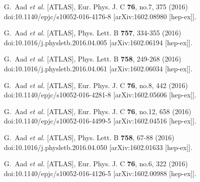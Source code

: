 \begin{thebibliography}{9}
G.~Aad \textit{et al.} [ATLAS],
Eur. Phys. J. C \textbf{76}, no.7, 375 (2016)
doi:10.1140/epjc/s10052-016-4176-8
[arXiv:1602.08980 [hep-ex]].

G.~Aad \textit{et al.} [ATLAS],
Phys. Lett. B \textbf{757}, 334-355 (2016)
doi:10.1016/j.physletb.2016.04.005
[arXiv:1602.06194 [hep-ex]].

G.~Aad \textit{et al.} [ATLAS],
Phys. Lett. B \textbf{758}, 249-268 (2016)
doi:10.1016/j.physletb.2016.04.061
[arXiv:1602.06034 [hep-ex]].

G.~Aad \textit{et al.} [ATLAS],
Eur. Phys. J. C \textbf{76}, no.8, 442 (2016)
doi:10.1140/epjc/s10052-016-4281-8
[arXiv:1602.05606 [hep-ex]].

G.~Aad \textit{et al.} [ATLAS],
Eur. Phys. J. C \textbf{76}, no.12, 658 (2016)
doi:10.1140/epjc/s10052-016-4499-5
[arXiv:1602.04516 [hep-ex]].

G.~Aad \textit{et al.} [ATLAS],
Phys. Lett. B \textbf{758}, 67-88 (2016)
doi:10.1016/j.physletb.2016.04.050
[arXiv:1602.01633 [hep-ex]].

G.~Aad \textit{et al.} [ATLAS],
Eur. Phys. J. C \textbf{76}, no.6, 322 (2016)
doi:10.1140/epjc/s10052-016-4126-5
[arXiv:1602.00988 [hep-ex]].


\end{thebibliography}
